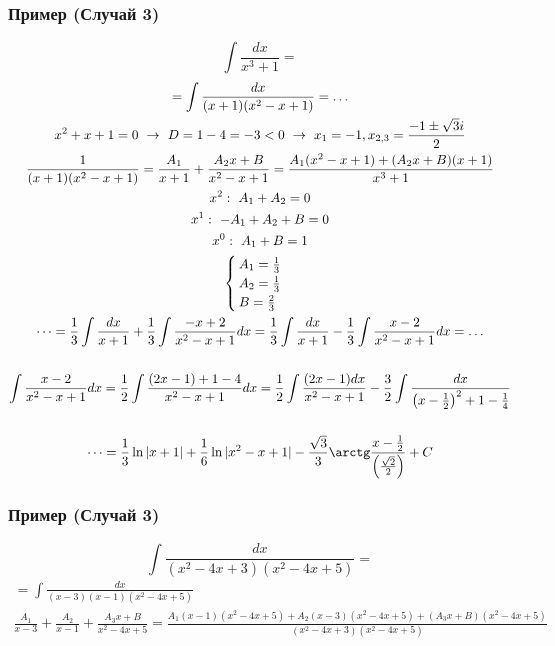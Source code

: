 \documentclass{article}
\begin{document}
\subsubsection{Пример (Случай 3)}
\[
    \int \frac{dx}{x^3 + 1} =
\]
\begin{gather*}
    = \int \frac{dx}{(x + 1)(x^2 - x + 1)} = \dots \\
    x^2 + x + 1 = 0 ~\rightarrow~ D = 1 - 4 = -3 < 0 ~\rightarrow~ x_1 = -1, x_{2, 3} = \frac{-1 \pm \sqrt{3}i}{2} \\
    \frac{1}{(x + 1)(x^2 - x + 1)} = \frac{A_1}{x + 1} + \frac{A_2x + B}{x^2 - x + 1} =
    \frac{A_1(x^2 - x + 1) + (A_2x + B)(x + 1)}{x^3 + 1} \\
    x^2:~  A_1 + A_2     = 0 \\
    x^1:~ -A_1 + A_2 + B = 0 \\
    x^0:~  A_1       + B = 1 \\
    \begin{cases}
        A_1 = \frac{1}{3} \\
        A_2 = \frac{1}{3} \\
        B   = \frac{2}{3}
    \end{cases} \\
    \dots = \frac{1}{3} \int \frac{dx}{x + 1} + \frac{1}{3} \int \frac{-x + 2}{x^2 - x + 1}dx =
    \frac{1}{3} \int \frac{dx}{x + 1} - \frac{1}{3} \int \frac{x - 2}{x^2 - x + 1}dx = \dots \\ \\
    \int \frac{x - 2}{x^2 - x + 1}dx = \frac{1}{2} \int \frac{(2x - 1) + 1 - 4}{x^2 - x + 1}dx = 
    \frac{1}{2} \int \frac{(2x - 1)dx}{x^2 - x + 1} - \frac{3}{2} \int \frac{dx}{\left( x - \frac{1}{2} \right)^2 + 1 - \frac{1}{4}} \\ \\
    \dots = \frac{1}{3} \ln |x + 1| + \frac{1}{6} \ln |x^2 - x + 1| - \frac{\sqrt{3}}{3} \arctg \frac{x - \frac{1}{2}}{\left(\frac{\sqrt{2}}{2}\right)} + C
\end{gather*}

\subsubsection{Пример (Случай 3)}
\[
    \int \frac{dx}{(x^2 - 4x + 3)(x^2 - 4x + 5)} = 
\]
\begin{gather*}
    = \int \frac{dx}{(x - 3)(x - 1)(x^2 - 4x + 5)} \\
    \frac{A_1}{x - 3} + \frac{A_2}{x - 1} + \frac{A_3x + B}{x^2 - 4x + 5} =
    \frac{A_1(x - 1)(x^2 - 4x + 5) + A_2(x - 3)(x^2 - 4x + 5) + (A_3x + B)(x^2 - 4x + 5)}{(x^2 - 4x + 3)(x^2 - 4x + 5)}
\end{gather*}
\end{document}
